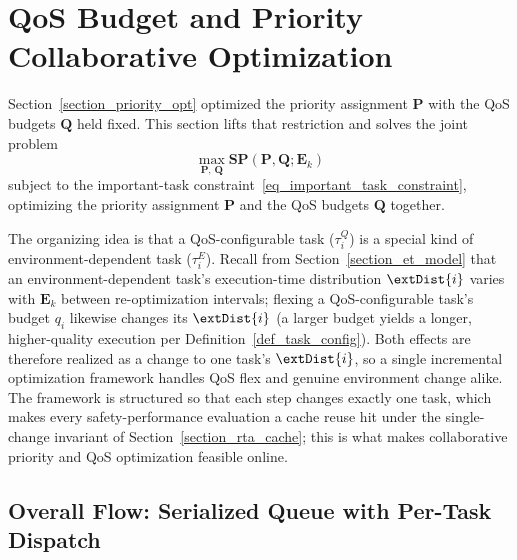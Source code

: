 	\section{QoS Budget and Priority Collaborative Optimization}
	\label{section_config_opt}

    Section~\ref{section_priority_opt} optimized the priority assignment $\boldsymbol{P}$ with the QoS budgets $\boldsymbol{Q}$ held fixed.
    This section lifts that restriction and solves the joint problem
    \begin{equation}
        \max_{\boldsymbol{P},\, \boldsymbol{Q}} \textbf{SP}(\boldsymbol{P}, \boldsymbol{Q}; \textbf{E}_k)
        \label{eq:joint_pa_qos}
    \end{equation}
    subject to the important-task constraint~\eqref{eq_important_task_constraint}, optimizing the priority assignment $\boldsymbol{P}$ and the QoS budgets $\boldsymbol{Q}$ together.

    The organizing idea is that a QoS-configurable task ($\tau^Q_i$) is a special kind of environment-dependent task ($\tau^E_i$).
    Recall from Section~\ref{section_et_model} that an environment-dependent task's execution-time distribution $\extDist{i}$ varies with $\textbf{E}_k$ between re-optimization intervals; flexing a QoS-configurable task's budget $q_i$ likewise changes its $\extDist{i}$ (a larger budget yields a longer, higher-quality execution per Definition~\ref{def_task_config}).
    Both effects are therefore realized as a change to one task's $\extDist{i}$, so a single incremental optimization framework handles QoS flex and genuine environment change alike.
    The framework is structured so that each step changes exactly one task, which makes every safety-performance evaluation a cache reuse hit under the single-change invariant of Section~\ref{section_rta_cache}; this is what makes collaborative priority and QoS optimization feasible online.

    \subsection{Overall Flow: Serialized Queue with Per-Task Dispatch}
    \label{section_overall_flow}


